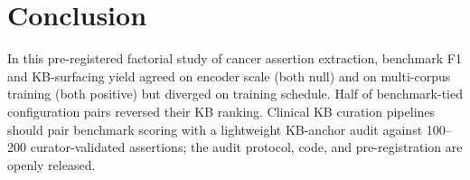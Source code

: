 \section{Conclusion}
\label{sec:conclusion}

In this pre-registered factorial study of cancer assertion
extraction, benchmark F1 and KB-surfacing yield agreed on encoder
scale (both null) and on multi-corpus training (both positive) but
diverged on training schedule. Half of benchmark-tied configuration
pairs reversed their KB ranking. Clinical KB curation pipelines
should pair benchmark scoring with a lightweight KB-anchor audit
against 100--200 curator-validated assertions; the audit protocol,
code, and pre-registration are openly released.
